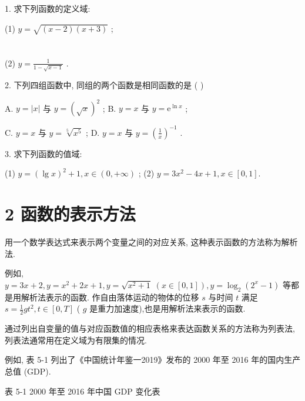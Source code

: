 \documentclass[10pt]{article}
\begin{document}
1. 求下列函数的定义域:

(1) \(y = \sqrt{\left( {x - 2}\right) \left( {x + 3}\right) }\) ;

\section*{}

(2) \(y = \frac{1}{1 - \sqrt{x - 1}}\) .

2. 下列四组函数中, 同组的两个函数是相同函数的是 ( )

A. \(y = \left| x\right|\) 与 \(y = {\left( \sqrt{x}\right) }^{2}\) ; B. \(y = x\) 与 \(y = {\mathrm{e}}^{\ln x}\) ;

C. \(y = x\) 与 \(y = \sqrt[5]{{x}^{5}}\) ; D. \(y = x\) 与 \(y = {\left( \frac{1}{x}\right) }^{-1}\) .

3. 求下列函数的值域:

(1) \(y = {\left( \lg x\right) }^{2} + 1,x \in  \left( {0, + \infty }\right)\) ; (2) \(y = 3{x}^{2} - {4x} + 1,x \in  \left\lbrack  {0,1}\right\rbrack  .\)

\section*{2 函数的表示方法}

用一个数学表达式来表示两个变量之间的对应关系, 这种表示函数的方法称为解析法.

例如, \(y = {3x} + 2,y = {x}^{2} + {2x} + 1,y = \sqrt{{x}^{2} + 1} \; \left( {x \in  \left\lbrack  {0,1}\right\rbrack  }\right) ,y = {\log }_{2}\left( {{2}^{x} - 1}\right)\) 等都是用解析法表示的函数. 作自由落体运动的物体的位移 \(s\) 与时间 \(t\) 满足 \(s = \frac{1}{2}g{t}^{2},t \in  \left\lbrack  {0,T}\right\rbrack\) ( \(g\) 是重力加速度),也是用解析法来表示的函数.

通过列出自变量的值与对应函数值的相应表格来表达函数关系的方法称为列表法, 列表法通常用在定义域为有限集的情况.

例如, 表 5-1 列出了《中国统计年鉴一2019》发布的 2000 年至 2016 年的国内生产总值 (GDP).

表 5-1 2000 年至 2016 年中国 GDP 变化表
\end{document}
